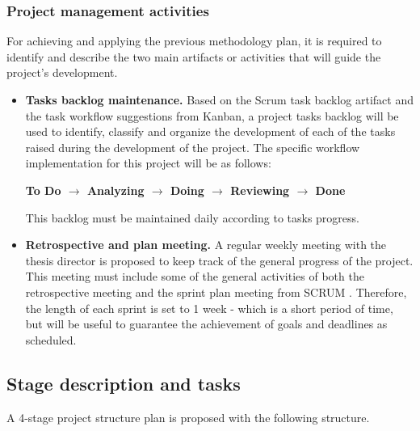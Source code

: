 \documentclass[11pt]{article}
\begin{document}
\subsubsection{Project management activities}

For achieving and applying the previous methodology plan, it is required to identify and describe the two main artifacts or activities that will guide the project's development.

\begin{itemize}
\item \textbf{Tasks backlog maintenance.} Based on the Scrum task backlog artifact and the task workflow suggestions from Kanban, a project tasks backlog will be used to identify, classify and organize the development of each of the tasks raised during the development of the project. The specific workflow implementation for this project will be as follows:
\begin{center}
\textbf{To Do $\rightarrow$ Analyzing $\rightarrow$ Doing $\rightarrow$ Reviewing $\rightarrow$ Done}
\end{center}
This backlog must be maintained daily according to tasks progress.
\item \textbf{Retrospective and plan meeting.} A regular weekly meeting with the thesis director is proposed to keep track of the general progress of the project. This meeting must include some of the general activities of both the retrospective meeting and the sprint plan meeting from SCRUM \cite{scrum}. Therefore, the length of each sprint is set to 1 week - which is a short period of time, but will be useful to guarantee the achievement of goals and deadlines as scheduled.
\end{itemize}

\subsection{Stage description and tasks}
\label{sec:stage}

A 4-stage project structure plan is proposed with the following structure.
\end{document}
